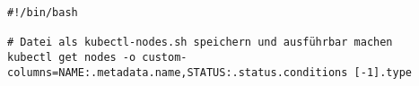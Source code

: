 \begin{verbatim}
#!/bin/bash

# Datei als kubectl-nodes.sh speichern und ausführbar machen
kubectl get nodes -o custom-columns=NAME:.metadata.name,STATUS:.status.conditions [-1].type
\end{verbatim}